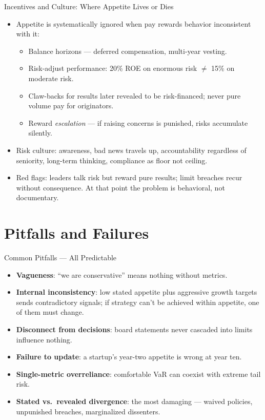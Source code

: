 \documentclass[11pt, aspectratio=169]{beamer}
\begin{document}
\begin{frame}{Incentives and Culture: Where Appetite Lives or Dies}
\begin{itemize}
  \item Appetite is systematically ignored when pay rewards behavior inconsistent with it:
  \begin{itemize}
    \item Balance horizons --- deferred compensation, multi-year vesting.
    \item Risk-adjust performance: 20\% ROE on enormous risk $\neq$ 15\% on moderate risk.
    \item Claw-backs for results later revealed to be risk-financed; never pure volume pay for originators.
    \item Reward \emph{escalation} --- if raising concerns is punished, risks accumulate silently.
  \end{itemize}
  \item \alert{Risk culture}: awareness, bad news travels up, accountability regardless of seniority, long-term thinking, compliance as floor not ceiling.
  \item Red flags: leaders talk risk but reward pure results; limit breaches recur without consequence. At that point the problem is behavioral, not documentary.
\end{itemize}
\end{frame}

\section{Pitfalls and Failures}

\begin{frame}{Common Pitfalls --- All Predictable}
\begin{itemize}
  \item \textbf{Vagueness}: ``we are conservative'' means nothing without metrics.
  \item \textbf{Internal inconsistency}: low stated appetite plus aggressive growth targets sends contradictory signals; if strategy can't be achieved within appetite, one of them must change.
  \item \textbf{Disconnect from decisions}: board statements never cascaded into limits influence nothing.
  \item \textbf{Failure to update}: a startup's year-two appetite is wrong at year ten.
  \item \textbf{Single-metric overreliance}: comfortable VaR can coexist with extreme tail risk.
  \item \textbf{Stated vs.\ revealed divergence}: the most damaging --- waived policies, unpunished breaches, marginalized dissenters.
\end{itemize}
\end{frame}
\end{document}
